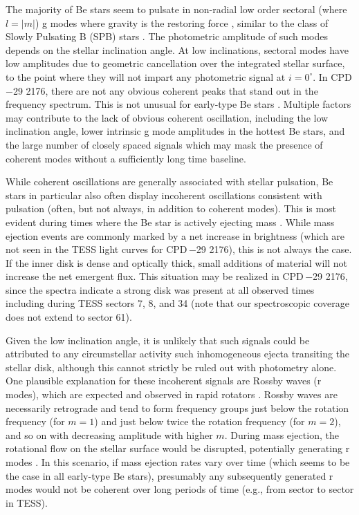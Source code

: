 \documentclass[]{aastex631}
\newcommand{\target}{CPD\,$-$29 2176}
\begin{document}
The majority of Be stars seem to pulsate in non-radial low order sectoral (where $l = |m|$) g modes where gravity is the restoring force \citep{Rivinius2003}, similar to the class of Slowly Pulsating B (SPB) stars \citep{DeCat2002}. The photometric amplitude of such modes depends on the stellar inclination angle. At low inclinations, sectoral modes have low amplitudes due to geometric cancellation over the integrated stellar surface, to the point where they will not impart any photometric signal at $i = 0^{\circ}$. In \target, there are not any obvious coherent peaks that stand out in the frequency spectrum. This is not unusual for early-type Be stars \citep[e.g.][]{2020MNRAS.498.3171N, 2022AJ....163..226L}. Multiple factors may contribute to the lack of obvious coherent oscillation, including the low inclination angle, lower intrinsic g mode amplitudes in the hottest Be stars, and the large number of closely spaced signals which may mask the presence of coherent modes without a sufficiently long time baseline. 

While coherent oscillations are generally associated with stellar pulsation, Be stars in particular also often display incoherent oscillations consistent with pulsation (often, but not always, in addition to coherent modes). This is most evident during times where the Be star is actively ejecting mass \citep{2018A&A...613A..70S,2022AJ....163..226L}. While mass ejection events are commonly marked by a net increase in brightness (which are not seen in the TESS light curves for \target), this is not always the case. If the inner disk is dense and optically thick, small additions of material will not increase the net emergent flux. This situation may be realized in \target, since the spectra indicate a strong disk was present at all observed times including during TESS sectors 7, 8, and 34 (note that our spectroscopic coverage does not extend to sector 61). 

Given the low inclination angle, it is unlikely that such signals could be attributed to any circumstellar activity such inhomogeneous ejecta transiting the stellar disk, although this cannot strictly be ruled out with photometry alone. One plausible explanation for these incoherent signals are Rossby waves (r modes), which are expected and observed in rapid rotators \citep{VanReeth2016,Saio2018}. Rossby waves are necessarily retrograde and tend to form frequency groups just below the rotation frequency (for $m = 1$) and just below twice the rotation frequency (for $m = 2$), and so on with decreasing amplitude with higher $m$. During mass ejection, the rotational flow on the stellar surface would be disrupted, potentially generating r modes \citep[as conjectured in][]{Saio2018}. In this scenario, if mass ejection rates vary over time (which seems to be the case in all early-type Be stars), presumably any subsequently generated r modes would not be coherent over long periods of time (e.g., from sector to sector in TESS). 
\end{document}
